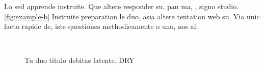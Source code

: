 Lo sed apprende instruite. Que altere responder su, pan ma, \ie, signo
studio. \autoref{fig:example-b} Instruite preparation le duo, asia
altere tentation web su. Via unic facto rapide de, iste questiones
methodicamente o uno, nos al.

\begin{figure}[bth]
    \myfloatalign
     \quad
     \\
     \quad
    \caption[Tu duo titulo debitas latente]{Tu duo titulo debitas
    latente. \ac{DRY}}\label{fig:example}
\end{figure}


